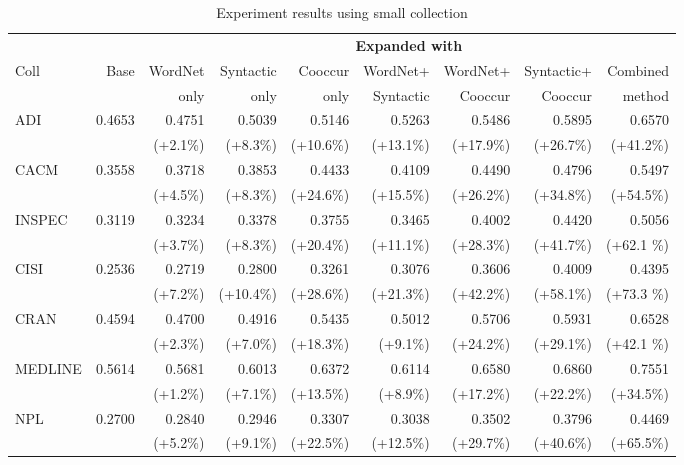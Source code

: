 \begin{table}[hbpt]
  \begin{center} 
    \caption{Experiment results using small collection}
   \vspace{3mm}
   \tiny
   \begin{tabular}{|l|r|r|r|r|r|r|r|r|} \hline
      &         &    \multicolumn{7}{|c|}{{\bf Expanded with}}\\ \cline{3-9}
Coll&    Base &   WordNet& Syntactic &  Cooccur & WordNet+&WordNet+&Syntactic+& Combined\\ 
      &         & only   & only    &  only & Syntactic&Cooccur&Cooccur&method\\ \hline 
ADI & 0.4653 & 0.4751  & 0.5039 & 0.5146 & 0.5263 & 0.5486 & 0.5895 &0.6570 \\ 
 & &  (+2.1\%) & (+8.3\%)  & (+10.6\%)  & (+13.1\%) & (+17.9\%)  & (+26.7\%) & (+41.2\%) \\ \hline
CACM & 0.3558 & 0.3718  & 0.3853 & 0.4433 & 0.4109 & 0.4490 & 0.4796 &0.5497 \\ 
 & &  (+4.5\%) & (+8.3\%)  & (+24.6\%)  & (+15.5\%) & (+26.2\%)  & (+34.8\%) & (+54.5\%) \\ \hline
INSPEC & 0.3119 & 0.3234  & 0.3378 & 0.3755 & 0.3465 & 0.4002 & 0.4420 &0.5056 \\ 
 & &  (+3.7\%) & (+8.3\%)  & (+20.4\%)  & (+11.1\%) & (+28.3\%)  & (+41.7\%) & (+62.1
\%) \\ \hline 
CISI & 0.2536 & 0.2719  & 0.2800 & 0.3261 & 0.3076 & 0.3606 & 0.4009 &0.4395 \\ 
&  &  (+7.2\%) & (+10.4\%)  & (+28.6\%)  & (+21.3\%) & (+42.2\%)  & (+58.1\%) & (+73.3
\%) \\ \hline
CRAN & 0.4594 & 0.4700  & 0.4916 & 0.5435 & 0.5012 & 0.5706 & 0.5931 &0.6528 \\ 
 & &  (+2.3\%) & (+7.0\%)  & (+18.3\%)  & (+9.1\%) & (+24.2\%)  & (+29.1\%) & (+42.1
\%) \\ \hline
MEDLINE & 0.5614 & 0.5681  & 0.6013 & 0.6372 & 0.6114 & 0.6580 & 0.6860 &0.7551 \\ 
&  &  (+1.2\%) & (+7.1\%)  & (+13.5\%)  & (+8.9\%) & (+17.2\%)  & (+22.2\%) & (+34.5\%) \\ \hline
NPL & 0.2700 & 0.2840  & 0.2946 & 0.3307 & 0.3038 & 0.3502 & 0.3796 &0.4469 \\ 
&  &  (+5.2\%) & (+9.1\%)  & (+22.5\%)  & (+12.5\%) & (+29.7\%)  & (+40.6\%) & (+65.5\%) \\ \hline
    \end{tabular}
   \label{tab:SmallResults}
  \end{center}
\end{table}
\normalsize


